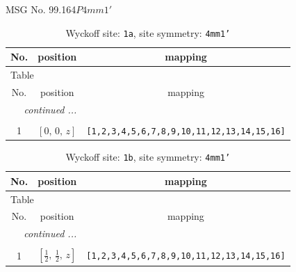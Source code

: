 \documentclass[fleqn,8pt]{jsarticle}
\begin{document}
\setcounter{MaxMatrixCols}{32}

\renewcommand{\tablename}{Table~}
\renewcommand{\figurename}{Figure~}
\begin{center}
\LARGE
MSG No. 99.164\quad$P4mm1'$
\end{center}
\renewcommand{\arraystretch}{1.2}
\begin{longtable}{ccc}
\caption{Wyckoff site: {\tt 1a}, site symmetry: {\tt 4mm1'}}
 \\
 \hline \hline
No. & position & mapping \\ \hline \endfirsthead

\multicolumn{2}{l}{\tablename\ \thetable{}} \\
 \hline \hline
No. & position & mapping \\ \hline \endhead

 \hline \hline
\multicolumn{2}{r}{\footnotesize\it continued ...} \\ \endfoot

 \hline \hline
\multicolumn{2}{r}{} \\ \endlastfoot

1 & $\left[ 0,\, 0,\, z \right]$ & {\tt [1,2,3,4,5,6,7,8,9,10,11,12,13,14,15,16]} \\
\end{longtable}
\renewcommand{\arraystretch}{1.2}
\begin{longtable}{ccc}
\caption{Wyckoff site: {\tt 1b}, site symmetry: {\tt 4mm1'}}
 \\
 \hline \hline
No. & position & mapping \\ \hline \endfirsthead

\multicolumn{2}{l}{\tablename\ \thetable{}} \\
 \hline \hline
No. & position & mapping \\ \hline \endhead

 \hline \hline
\multicolumn{2}{r}{\footnotesize\it continued ...} \\ \endfoot

 \hline \hline
\multicolumn{2}{r}{} \\ \endlastfoot

1 & $\left[ \frac{1}{2},\, \frac{1}{2},\, z \right]$ & {\tt [1,2,3,4,5,6,7,8,9,10,11,12,13,14,15,16]} \\
\end{longtable}
\renewcommand{\arraystretch}{1.2}
\end{document}
